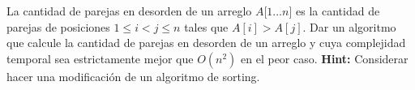 
La cantidad de parejas en desorden de un arreglo $A$[$1\ldots n$] es la cantidad de parejas de posiciones $1 \leq i < j \leq n$ tales que $A[i] > A[j]$.  Dar un algoritmo que calcule la cantidad de parejas en desorden de un arreglo y cuya complejidad temporal sea estrictamente mejor que $O(n^2)$ en el peor caso. \textbf{Hint:} Considerar hacer una modificación de un algoritmo de sorting.
